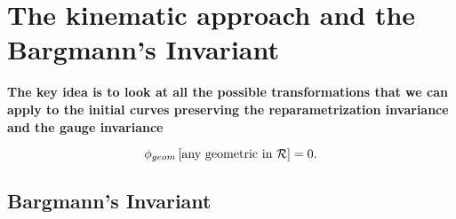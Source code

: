 \chapter{The kinematic approach and the Bargmann's Invariant}

\textbf{The key idea is to look at all the possible transformations that we can apply to the initial curves preserving the reparametrization invariance and the gauge invariance}






\begin{equation}
\phi_{geom}\left[\text{any geometric in $ \mathcal{R} $} \right]=0.
\end{equation}
\section{Bargmann's Invariant}